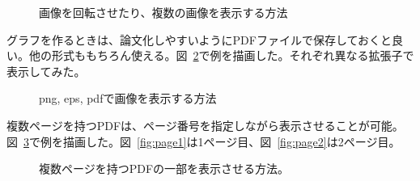 \documentclass[a4j]{jsarticle}
\begin{document}
\begin{figure}[htbp]
\caption{画像を回転させたり、複数の画像を表示する方法\label{fig:multi_images}}
\end{figure}

グラフを作るときは、論文化しやすいようにPDFファイルで保存しておくと良い。他の形式ももちろん使える。図~\ref{fig:various_extension}で例を描画した。それぞれ異なる拡張子で表示してみた。

\begin{figure}[htbp]
\centering
{}
\caption{png, eps, pdfで画像を表示する方法\label{fig:various_extension}}
\end{figure}

複数ページを持つPDFは、ページ番号を指定しながら表示させることが可能。図~\ref{fig:multi_page}で例を描画した。図~\ref{fig:page1}は1ページ目、図~\ref{fig:page2}は2ページ目。

\begin{figure}[htbp]
\centering
{}
\caption{複数ページを持つPDFの一部を表示させる方法。\label{fig:multi_page}}
\end{figure}
\end{document}
